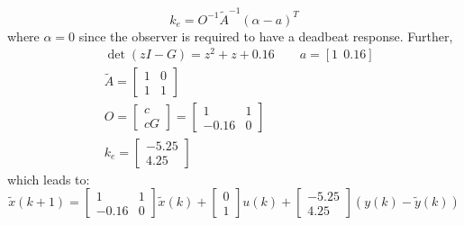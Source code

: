 \[
k_e = O^{-1} \tilde{A}^{-1}(\alpha-a)^T
\]
where $\alpha=0$ since the observer is required to have a deadbeat response. Further,
\begin{align*}
& \det(zI-G)=z^2+z+0.16 \qquad a =[1 \ \ 0.16] \\
& \tilde{A} = \begin{bmatrix}
1 & 0 \\
1 & 1 
\end{bmatrix} \\
& O = \begin{bmatrix}
c \\
cG
\end{bmatrix} = \begin{bmatrix}
1     & 1 \\
-0.16 & 0
\end{bmatrix} \\
& k_e = \begin{bmatrix}
-5.25 \\ 4.25
\end{bmatrix}
\end{align*}
which leads to:
\[
\tilde{x}(k+1)=  \begin{bmatrix}
1     & 1 \\
-0.16 & 0
\end{bmatrix}\tilde{x}(k) + \begin{bmatrix}
0 \\ 1
\end{bmatrix} u(k) +  \begin{bmatrix}
-5.25 \\ 4.25
\end{bmatrix} (y(k)- \tilde{y}(k))
\]

